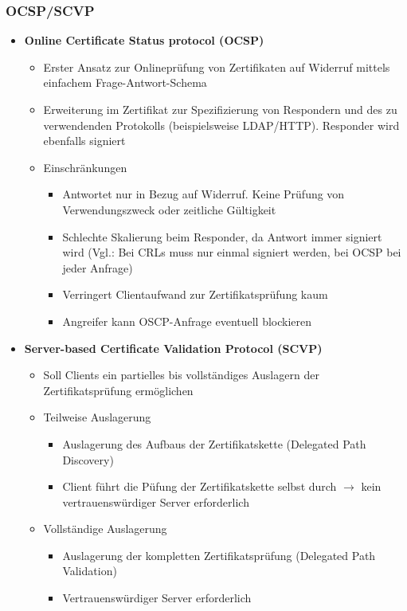 \subsubsection{OCSP/SCVP}
\begin{itemize}
	\item \textbf{Online Certificate Status protocol (OCSP)}
	\begin{itemize}
		\item Erster Ansatz zur Onlineprüfung von Zertifikaten auf Widerruf mittels einfachem Frage-Antwort-Schema
		\item Erweiterung im Zertifikat zur Spezifizierung von Respondern und des zu verwendenden Protokolls (beispielsweise LDAP/HTTP). Responder wird ebenfalls signiert
		\item Einschränkungen
		\begin{itemize}
			\item Antwortet nur in Bezug auf Widerruf. Keine Prüfung von Verwendungszweck oder zeitliche Gültigkeit
			\item Schlechte Skalierung beim Responder, da Antwort immer signiert wird (Vgl.: Bei CRLs muss nur einmal signiert werden, bei OCSP bei jeder Anfrage)
			\item Verringert Clientaufwand zur Zertifikatsprüfung kaum
			\item Angreifer kann OSCP-Anfrage eventuell blockieren
		\end{itemize}
	\end{itemize}
	\item \textbf{Server-based Certificate Validation Protocol (SCVP)}
	\begin{itemize}
		\item Soll Clients ein partielles bis vollständiges Auslagern der Zertifikatsprüfung ermöglichen
		\item Teilweise Auslagerung
		\begin{itemize}
			\item Auslagerung des Aufbaus der Zertifikatskette (Delegated Path Discovery)
			\item Client führt die Püfung der Zertifikatskette selbst durch \(\rightarrow\) kein vertrauenswürdiger Server erforderlich
		\end{itemize}
		\item Vollständige Auslagerung
		\begin{itemize}
			\item Auslagerung der kompletten Zertifikatsprüfung (Delegated Path Validation)
			\item Vertrauenswürdiger Server erforderlich
		\end{itemize}
	\end{itemize}
\end{itemize}



